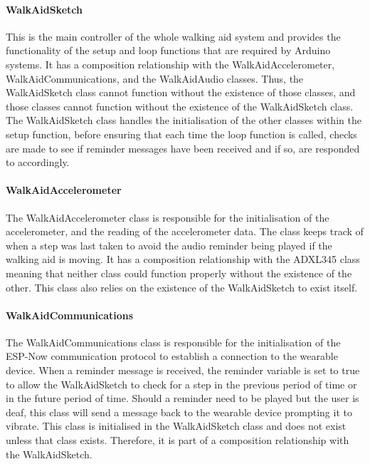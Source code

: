                         \clearpage
                        \thispagestyle{empty}
                        \begin{landscape}
                            
                        \end{landscape}
        
                        \paragraph{WalkAidSketch}\mbox{}
        
                            This is the main controller of the whole walking aid system and provides the functionality of the setup and loop functions that are required by Arduino systems. It has a composition relationship with the WalkAidAccelerometer, WalkAidCommunications, and the WalkAidAudio classes. Thus, the WalkAidSketch class cannot function without the existence of those classes, and those classes cannot function without the existence of the WalkAidSketch class. The WalkAidSketch class handles the initialisation of the other classes within the setup function, before ensuring that each time the loop function is called, checks are made to see if reminder messages have been received and if so, are responded to accordingly.
        
                        \paragraph{WalkAidAccelerometer}\mbox{}
        
                            The WalkAidAccelerometer class is responsible for the initialisation of the accelerometer, and the reading of the accelerometer data. The class keeps track of when a step was last taken to avoid the audio reminder being played if the walking aid is moving. It has a composition relationship with the ADXL345 class meaning that neither class could function properly without the existence of the other. This class also relies on the existence of the WalkAidSketch to exist itself.
        
                        \paragraph{WalkAidCommunications}\mbox{}
        
                            The WalkAidCommunications class is responsible for the initialisation of the ESP-Now communication protocol to establish a connection to the wearable device. When a reminder message is received, the reminder variable is set to true to allow the WalkAidSketch to check for a step in the previous period of time or in the future period of time. Should a reminder need to be played but the user is deaf, this class will send a message back to the wearable device prompting it to vibrate. This class is initialised in the WalkAidSketch class and does not exist unless that class exists. Therefore, it is part of a composition relationship with the WalkAidSketch.
        
